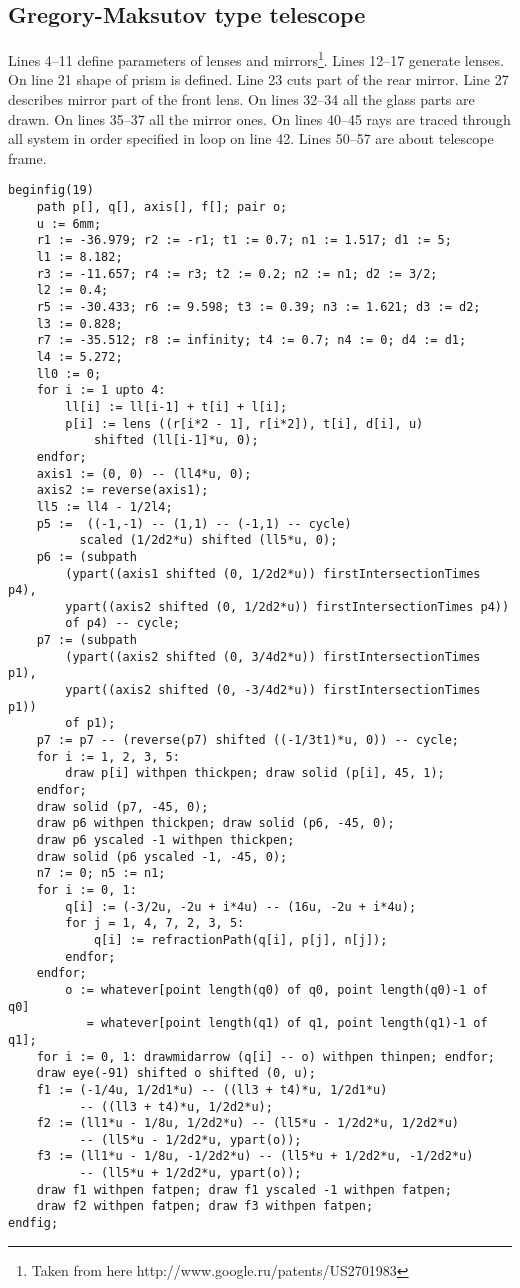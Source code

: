 \documentclass{article}
\begin{document}
\begin{empfile}
\subsection{Gregory-Maksutov type telescope}
Lines 4--11 define parameters of lenses and mirrors\footnote{Taken from here http://www.google.ru/patents/US2701983}. Lines 12--17 generate lenses. On line 21 shape of prism is defined. Line 23 cuts part of the rear mirror. Line 27 describes mirror part of the front lens. On lines 32--34 all the glass parts are drawn. On lines 35--37 all the mirror ones. On lines 40--45 rays are traced through all system in order specified in loop on line 42. Lines 50--57 are about telescope frame.
\begin{lstlisting}
beginfig(19)
    path p[], q[], axis[], f[]; pair o;
    u := 6mm;
    r1 := -36.979; r2 := -r1; t1 := 0.7; n1 := 1.517; d1 := 5;
    l1 := 8.182;
    r3 := -11.657; r4 := r3; t2 := 0.2; n2 := n1; d2 := 3/2;
    l2 := 0.4;
    r5 := -30.433; r6 := 9.598; t3 := 0.39; n3 := 1.621; d3 := d2;
    l3 := 0.828;
    r7 := -35.512; r8 := infinity; t4 := 0.7; n4 := 0; d4 := d1;
    l4 := 5.272;
    ll0 := 0;
    for i := 1 upto 4:
    	ll[i] := ll[i-1] + t[i] + l[i];
    	p[i] := lens ((r[i*2 - 1], r[i*2]), t[i], d[i], u) 
	        shifted (ll[i-1]*u, 0);
    endfor;
    axis1 := (0, 0) -- (ll4*u, 0);
    axis2 := reverse(axis1);
    ll5 := ll4 - 1/2l4;
    p5 :=  ((-1,-1) -- (1,1) -- (-1,1) -- cycle)
          scaled (1/2d2*u) shifted (ll5*u, 0);
    p6 := (subpath 
        (ypart((axis1 shifted (0, 1/2d2*u)) firstIntersectionTimes p4), 
        ypart((axis2 shifted (0, 1/2d2*u)) firstIntersectionTimes p4))
        of p4) -- cycle;
    p7 := (subpath 
        (ypart((axis2 shifted (0, 3/4d2*u)) firstIntersectionTimes p1), 
        ypart((axis2 shifted (0, -3/4d2*u)) firstIntersectionTimes p1))
        of p1);
    p7 := p7 -- (reverse(p7) shifted ((-1/3t1)*u, 0)) -- cycle;
    for i := 1, 2, 3, 5: 
        draw p[i] withpen thickpen; draw solid (p[i], 45, 1); 
    endfor;
    draw solid (p7, -45, 0);
    draw p6 withpen thickpen; draw solid (p6, -45, 0);
    draw p6 yscaled -1 withpen thickpen;
    draw solid (p6 yscaled -1, -45, 0);
    n7 := 0; n5 := n1;
    for i := 0, 1:
        q[i] := (-3/2u, -2u + i*4u) -- (16u, -2u + i*4u);
        for j = 1, 4, 7, 2, 3, 5: 
            q[i] := refractionPath(q[i], p[j], n[j]);
        endfor;
    endfor;
        o := whatever[point length(q0) of q0, point length(q0)-1 of q0] 
           = whatever[point length(q1) of q1, point length(q1)-1 of q1];
    for i := 0, 1: drawmidarrow (q[i] -- o) withpen thinpen; endfor;
    draw eye(-91) shifted o shifted (0, u);
    f1 := (-1/4u, 1/2d1*u) -- ((ll3 + t4)*u, 1/2d1*u)
          -- ((ll3 + t4)*u, 1/2d2*u);
    f2 := (ll1*u - 1/8u, 1/2d2*u) -- (ll5*u - 1/2d2*u, 1/2d2*u)
          -- (ll5*u - 1/2d2*u, ypart(o));
    f3 := (ll1*u - 1/8u, -1/2d2*u) -- (ll5*u + 1/2d2*u, -1/2d2*u)
          -- (ll5*u + 1/2d2*u, ypart(o));
    draw f1 withpen fatpen; draw f1 yscaled -1 withpen fatpen;
    draw f2 withpen fatpen; draw f3 withpen fatpen;
endfig;
\end{lstlisting}


\end{empfile}
\end{document}
